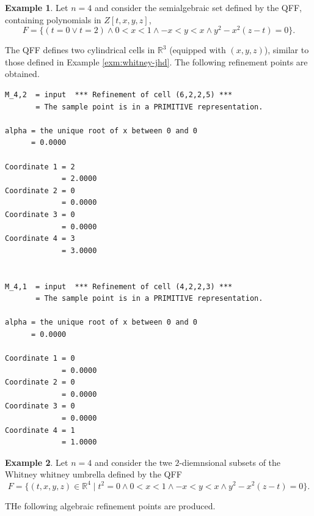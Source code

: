 \documentclass[
]{book}
\theoremstyle{definition}
\theoremstyle{definition}
\newtheorem{example}{Example}[chapter]
\theoremstyle{definition}
\theoremstyle{definition}
\theoremstyle{remark}
\begin{document}
\begin{example}
\protect\hypertarget{exm:fr-4-whitney-multi}{}\label{exm:fr-4-whitney-multi}Let \(n = 4\) and consider the semialgebraic set defined by the QFF, containing polynomials in \(Z[t,x,y,z]\),
\[
F = \{ (t = 0 \lor t = 2) \land 0 < x < 1 \land -x < y < x \land y^2 - x^2 (z - t) = 0 \}.
\]
\end{example}

The QFF defines two cylindrical cells in \(\mathbb{R}^3\) (equipped with \((x,y,z)\)), similar to those defined in Example \ref{exm:whitney-jhd}.
The following refinement points are obtained.

\begin{verbatim}
M_4,2  = input  *** Refinement of cell (6,2,2,5) ***  
       = The sample point is in a PRIMITIVE representation.

alpha = the unique root of x between 0 and 0
      = 0.0000

Coordinate 1 = 2
             = 2.0000
Coordinate 2 = 0
             = 0.0000
Coordinate 3 = 0
             = 0.0000
Coordinate 4 = 3
             = 3.0000


M_4,1  = input  *** Refinement of cell (4,2,2,3) ***  
       = The sample point is in a PRIMITIVE representation.

alpha = the unique root of x between 0 and 0
      = 0.0000

Coordinate 1 = 0
             = 0.0000
Coordinate 2 = 0
             = 0.0000
Coordinate 3 = 0
             = 0.0000
Coordinate 4 = 1
             = 1.0000
\end{verbatim}

\begin{example}
\protect\hypertarget{exm:fr-4-whitney-alg}{}\label{exm:fr-4-whitney-alg}Let \(n = 4\) and consider the twe \(2\)-diemnsional subsets of the Whitney whitney umbrella defined by the QFF
\[
F = \{ (t,x,y,z) \in \mathbb{R}^4 \mid t^2 = 0 \land 0 < x < 1 \land -x < y < x \land y^2 - x^2 (z - t) = 0 \}.
\]
\end{example}

THe following algebraic refinement points are produced.
\end{document}
